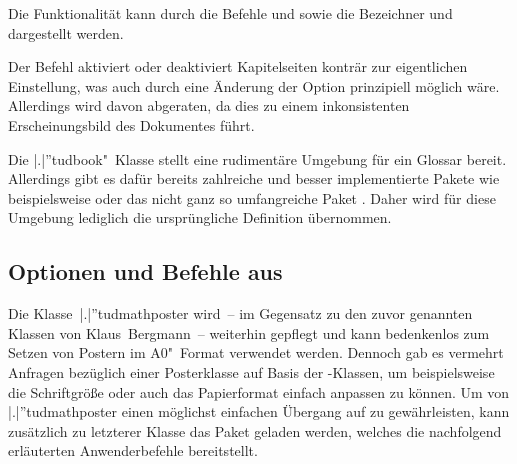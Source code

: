 \begin{DeclareEntity}{}
\begin{NoIndexDefault}
\begin{Declaration}
  {}
\printdeclarationlist
%
Die Funktionalität kann durch die Befehle  und 
 sowie die Bezeichner  und 
 dargestellt werden.
\end{Declaration}

\begin{Declaration}
  {}
\printdeclarationlist
%
Der Befehl aktiviert oder deaktiviert Kapitelseiten konträr zur eigentlichen 
Einstellung, was auch durch eine Änderung der Option  
prinzipiell möglich wäre. Allerdings wird davon abgeraten, da dies zu einem 
inkonsistenten Erscheinungsbild des Dokumentes führt.
\end{Declaration}

\begin{Declaration}
  {}
\begin{Declaration}
  {}
\printdeclarationlist
%
Die \Class|.|''{tudbook}"~Klasse stellt eine rudimentäre Umgebung für ein 
Glossar bereit. Allerdings gibt es dafür bereits zahlreiche und besser 
implementierte Pakete wie beispielsweise  oder das nicht 
ganz so umfangreiche Paket . Daher wird für diese Umgebung 
lediglich die ursprüngliche Definition übernommen. 
\end{Declaration}
\end{Declaration}
%



\subsection{%
  Optionen und Befehle aus %
}
%
%
Die Klasse~\Class|.|''{tudmathposter} wird~-- im Gegensatz zu den zuvor 
genannten Klassen von Klaus~Bergmann~-- weiterhin gepflegt und kann bedenkenlos 
zum Setzen von Postern im A0"~Format verwendet werden. Dennoch gab es vermehrt 
Anfragen bezüglich einer Posterklasse auf Basis der \TUDScript-Klassen, um 
beispielsweise die Schriftgröße oder auch das Papierformat einfach anpassen zu 
können. Um von \Class|.|''{tudmathposter} einen möglichst einfachen Übergang 
auf  zu gewährleisten, kann zusätzlich zu letzterer Klasse 
das Paket  geladen werden, welches die nachfolgend 
erläuterten Anwenderbefehle bereitstellt.


\end{NoIndexDefault}
\end{DeclareEntity}
